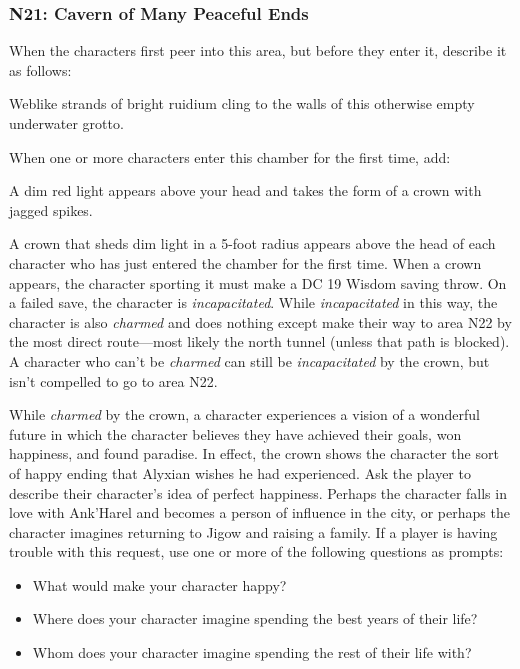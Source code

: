 \documentclass[letterpaper, 11pt, bg=full, twocolumn]{dndbook}
\begin{document}
\subsubsection{N21: Cavern of Many Peaceful Ends}

When the characters first peer into this area, but before they enter it, describe it as follows:

\begin{DndReadAloud}
Weblike strands of bright ruidium cling to the walls of this otherwise empty underwater grotto.
\end{DndReadAloud}

When one or more characters enter this chamber for the first time, add:

\begin{DndReadAloud}
A dim red light appears above your head and takes the form of a crown with jagged spikes.
\end{DndReadAloud}

A crown that sheds dim light in a 5-foot radius appears above the head of each character who has just entered the chamber for the first time. When a crown appears, the character sporting it must make a DC 19 Wisdom saving throw. On a failed save, the character is \textit{incapacitated}. While \textit{incapacitated} in this way, the character is also \textit{charmed} and does nothing except make their way to area N22 by the most direct route---most likely the north tunnel (unless that path is blocked). A character who can't be \textit{charmed} can still be \textit{incapacitated} by the crown, but isn't compelled to go to area N22.

While \textit{charmed} by the crown, a character experiences a vision of a wonderful future in which the character believes they have achieved their goals, won happiness, and found paradise. In effect, the crown shows the character the sort of happy ending that Alyxian wishes he had experienced. Ask the player to describe their character's idea of perfect happiness. Perhaps the character falls in love with Ank'Harel and becomes a person of influence in the city, or perhaps the character imagines returning to Jigow and raising a family. If a player is having trouble with this request, use one or more of the following questions as prompts:

\begin{itemize}
\item What would make your character happy?
\item Where does your character imagine spending the best years of their life?
\item Whom does your character imagine spending the rest of their life with?
\end{itemize}
\end{document}
